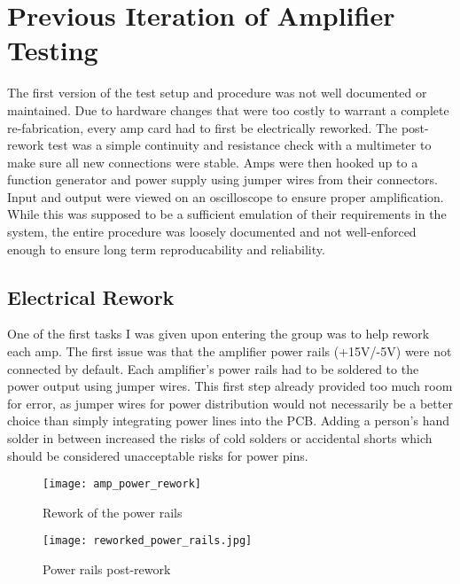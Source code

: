 %
%
\chapter{Previous Iteration of Amplifier Testing}
The first version of the test setup and procedure was not well documented or maintained. Due to hardware changes that were too costly to warrant a complete re-fabrication, every amp card had to first be electrically reworked. The post-rework test was a simple continuity and resistance check with a multimeter to make sure all new connections were stable. Amps were then hooked up to a function generator and power supply using jumper wires from their connectors. Input and output were viewed on an oscilloscope to ensure proper amplification. While this was supposed to be a sufficient emulation of their requirements in the system, the entire procedure was loosely documented and not well-enforced enough to ensure long term reproducability and reliability.
\section{Electrical Rework}
One of the first tasks I was given upon entering the group was to help rework each amp. The first issue was that the amplifier power rails (+15V/-5V) were not connected by default. Each amplifier's power rails had to be soldered to the power output using jumper wires. This first step already provided too much room for error, as jumper wires for power distribution would not necessarily be a better choice than simply integrating power lines into the PCB. Adding a person's hand solder in between increased the risks of cold solders or accidental shorts which should be considered unacceptable risks for power pins. \par
\begin{figure}[!htb]
	\texttt{[image: amp\_power\_rework]}
	\centering
	\caption{Rework of the power rails}
	\centering
	\texttt{[image: reworked\_power\_rails.jpg]}
	\centering
	\caption{Power rails post-rework}
\end{figure}
